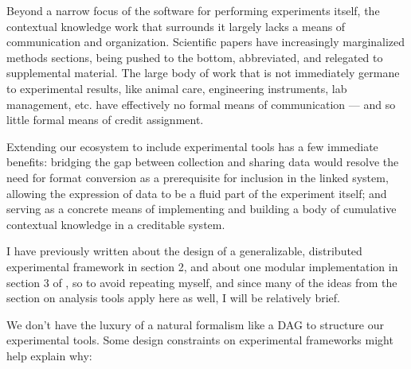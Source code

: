 \documentclass[10pt]{tufte-book}
\begin{document}
Beyond a narrow focus of the software for performing experiments itself,
the contextual knowledge work that surrounds it largely lacks a means of
communication and organization. Scientific papers have increasingly
marginalized methods sections, being pushed to the bottom, abbreviated,
and relegated to supplemental material. The large body of work that is
not immediately germane to experimental results, like animal care,
engineering instruments, lab management, etc. have effectively no formal
means of communication --- and so little formal means of credit
assignment.

Extending our ecosystem to include experimental tools has a few
immediate benefits: bridging the gap between collection and sharing data
would resolve the need for format conversion as a prerequisite for
inclusion in the linked system, allowing the expression of data to be a
fluid part of the experiment itself; and serving as a concrete means of
implementing and building a body of cumulative contextual knowledge in a
creditable system.

I have previously written about the design of a generalizable,
distributed experimental framework in section 2, and about one modular
implementation in section 3 of \citep{saundersAutopilotAutomatingBehavioral2019} , so to avoid repeating
myself, and since many of the ideas from the section on analysis tools
apply here as well, I will be relatively brief.

We don't have the luxury of a natural formalism like a DAG to structure
our experimental tools. Some design constraints on experimental
frameworks might help explain why:
\end{document}
